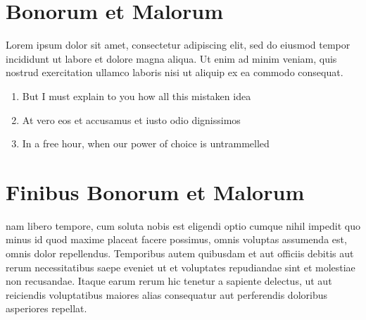 \section{Bonorum et Malorum}
Lorem ipsum dolor sit amet, consectetur adipiscing elit, sed do eiusmod tempor incididunt ut labore et dolore magna aliqua. Ut enim ad minim veniam, quis nostrud exercitation ullamco laboris nisi ut aliquip ex ea commodo consequat. 

\begin{enumerate}
    \item But I must explain to you how all this mistaken idea
    \item At vero eos et accusamus et iusto odio dignissimos
    \item In a free hour, when our power of choice is untrammelled
\end{enumerate}

\section{Finibus Bonorum et Malorum}
 nam libero tempore, cum soluta nobis est eligendi optio cumque nihil impedit quo minus id quod maxime placeat facere possimus, omnis voluptas assumenda est, omnis dolor repellendus. Temporibus autem quibusdam et aut officiis debitis aut rerum necessitatibus saepe eveniet ut et voluptates repudiandae sint et molestiae non recusandae. Itaque earum rerum hic tenetur a sapiente delectus, ut aut reiciendis voluptatibus maiores alias consequatur aut perferendis doloribus asperiores repellat.